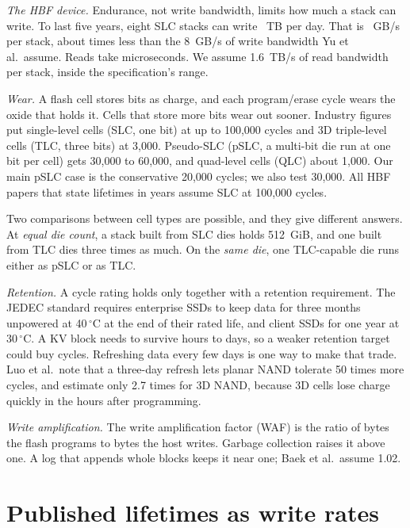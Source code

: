 \documentclass[journal]{IEEEtran}
\begin{document}
\emph{The HBF device.} Endurance, not write bandwidth, limits how much a stack can write. To last five years, eight SLC stacks can write \BudgetSLCNodeTB{}~TB per day. That is \SimEnduranceGBs{}~GB/s per stack, about \SimWriteBwRatio{} times less than the 8~GB/s of write bandwidth Yu et al.\ assume.\cite{yu2026hbf} Reads take microseconds. We assume 1.6~TB/s of read bandwidth per stack, inside the specification's range.

\emph{Wear.} A flash cell stores bits as charge, and each program/erase cycle wears the oxide that holds it. Cells that store more bits wear out sooner. Industry figures put single-level cells (SLC, one bit) at up to 100,000 cycles and 3D triple-level cells (TLC, three bits) at 3,000. Pseudo-SLC (pSLC, a multi-bit die run at one bit per cell) gets 30,000 to 60,000, and quad-level cells (QLC) about 1,000.\cite{swissbit2022pslc} Our main pSLC case is the conservative 20,000 cycles; we also test 30,000. All HBF papers that state lifetimes in years assume SLC at 100,000 cycles.

Two comparisons between cell types are possible, and they give different answers. At \emph{equal die count}, a stack built from SLC dies holds 512~GiB, and one built from TLC dies three times as much. On the \emph{same die}, one TLC-capable die runs either as pSLC or as TLC.

\emph{Retention.} A cycle rating holds only together with a retention requirement. The JEDEC standard requires enterprise SSDs to keep data for three months unpowered at 40\,$^{\circ}$C at the end of their rated life, and client SSDs for one year at 30\,$^{\circ}$C.\cite{jedec218} A KV block needs to survive hours to days, so a weaker retention target could buy cycles. Refreshing data every few days is one way to make that trade. Luo et al.\ note that a three-day refresh lets planar NAND tolerate 50 times more cycles, and estimate only 2.7 times for 3D NAND, because 3D cells lose charge quickly in the hours after programming.\cite{luo2018improving}

\emph{Write amplification.} The write amplification factor (WAF) is the ratio of bytes the flash programs to bytes the host writes. Garbage collection raises it above one. A log that appends whole blocks keeps it near one; Baek et al.\ assume 1.02.\cite{baek2026hotcold}

\section{Published lifetimes as write rates}
\end{document}
